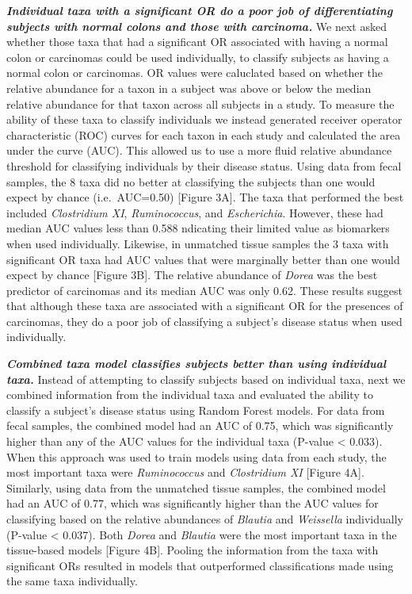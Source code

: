 \documentclass[12pt,]{article}
\begin{document}
\textbf{\emph{Individual taxa with a significant OR do a poor job of
differentiating subjects with normal colons and those with carcinoma.}}
We next asked whether those taxa that had a significant OR associated
with having a normal colon or carcinomas could be used individually, to
classify subjects as having a normal colon or carcinomas. OR values were
caluclated based on whether the relative abundance for a taxon in a
subject was above or below the median relative abundance for that taxon
across all subjects in a study. To measure the ability of these taxa to
classify individuals we instead generated receiver operator
characteristic (ROC) curves for each taxon in each study and calculated
the area under the curve (AUC). This allowed us to use a more fluid
relative abundance threshold for classifying individuals by their
disease status. Using data from fecal samples, the 8 taxa did no better
at classifying the subjects than one would expect by chance
(i.e.~AUC=0.50) {[}Figure 3A{]}. The taxa that performed the best
included \emph{Clostridium XI}, \emph{Ruminococcus}, and
\emph{Escherichia}. However, these had median AUC values less than 0.588
ndicating their limited value as biomarkers when used individually.
Likewise, in unmatched tissue samples the 3 taxa with significant OR
taxa had AUC values that were marginally better than one would expect by
chance {[}Figure 3B{]}. The relative abundance of \emph{Dorea} was the
best predictor of carcinomas and its median AUC was only 0.62. These
results suggest that although these taxa are associated with a
significant OR for the presences of carcinomas, they do a poor job of
classifying a subject's disease status when used individually.

\textbf{\emph{Combined taxa model classifies subjects better than using
individual taxa.}} Instead of attempting to classify subjects based on
individual taxa, next we combined information from the individual taxa
and evaluated the ability to classify a subject's disease status using
Random Forest models. For data from fecal samples, the combined model
had an AUC of 0.75, which was significantly higher than any of the AUC
values for the individual taxa (P-value \textless{} 0.033). When this
approach was used to train models using data from each study, the most
important taxa were \emph{Ruminococcus} and \emph{Clostridium XI}
{[}Figure 4A{]}. Similarly, using data from the unmatched tissue
samples, the combined model had an AUC of 0.77, which was significantly
higher than the AUC values for classifying based on the relative
abundances of \emph{Blautia} and \emph{Weissella} individually (P-value
\textless{} 0.037). Both \emph{Dorea} and \emph{Blautia} were the most
important taxa in the tissue-based models {[}Figure 4B{]}. Pooling the
information from the taxa with significant ORs resulted in models that
outperformed classifications made using the same taxa individually.
\end{document}
